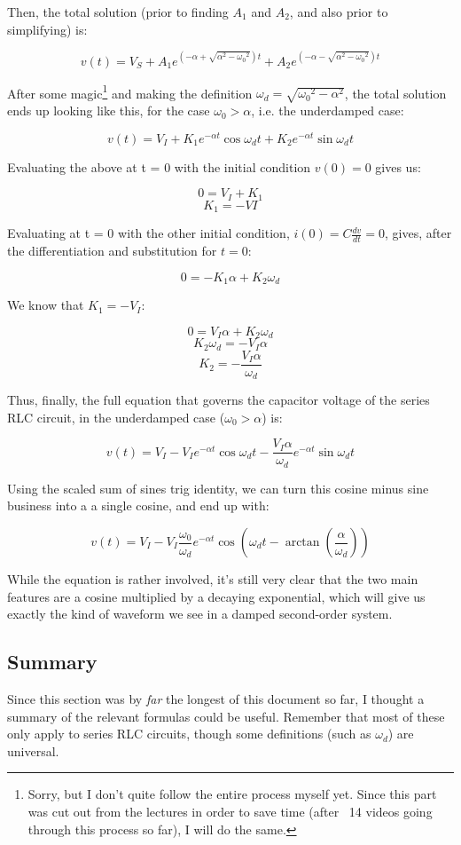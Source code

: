 \documentclass[12pt,a4paper]{report}
\begin{document}
Then, the total solution (prior to finding $A_1$ and $A_2$, and also prior to simplifying) is:

\[ v(t) = V_S + A_1 e^{(-\alpha + \sqrt{\alpha^2 - {\omega_0}^2}) t} + A_2 e^{(-\alpha - \sqrt{\alpha^2 - {\omega_0}^2}) t} \]

After some magic\footnote{Sorry, but I don't quite follow the entire process myself yet. Since this part was cut out from the lectures in order to save time (after ~14 videos going through this process so far), I will do the same.} and making the definition $\omega_d = \sqrt{{\omega_0}^2 - \alpha^2}$, the total solution ends up looking like this, for the case $\omega_0 > \alpha$, i.e. the underdamped case:

\[ v(t) = V_I + K_1 e^{-\alpha t} \cos{\omega_d t} + K_2 e^{-\alpha t} \sin{\omega_d t} \]

Evaluating the above at t = 0 with the initial condition $v(0) = 0$ gives us:

\[ 0 = V_I + K_1 \]
\[ K_1 = -VI \]

Evaluating at t = 0 with the other initial condition, $\displaystyle i(0) = C \frac{dv}{dt} = 0$, gives, after the differentiation and substitution for $t = 0$:

\[ 0 = -K_1 \alpha + K_2 \omega_d \]

We know that $K_1 = -V_I$:

\[ 0 = V_I \alpha + K_2 \omega_d \]
\[ K_2 \omega_d = -V_I \alpha \]
\[ K_2 = -\frac{V_I \alpha}{\omega_d} \]

Thus, finally, the full equation that governs the capacitor voltage of the series RLC circuit, in the underdamped case ($\omega_0 > \alpha$) is:

\[ v(t) = V_I - V_I e^{-\alpha t} \cos{\omega_d t} - \frac{V_I \alpha}{\omega_d} e^{-\alpha t} \sin{\omega_d t} \]

Using the scaled sum of sines trig identity, we can turn this cosine minus sine business into a a single cosine, and end up with:

\[ v(t) = V_I - V_I \frac{\omega_0}{\omega_d} e^{-\alpha t} \cos{(\omega_d t - \arctan{(\frac{\alpha}{\omega_d})})} \]

While the equation is rather involved, it's still very clear that the two main features are a cosine multiplied by a decaying exponential, which will give us exactly the kind of waveform we see in a damped second-order system.

\subsection{Summary}
Since this section was by \emph{far} the longest of this document so far, I thought a summary of the relevant formulas could be useful. Remember that most of these only apply to series RLC circuits, though some definitions (such as $\omega_d$) are universal.\\
\end{document}
